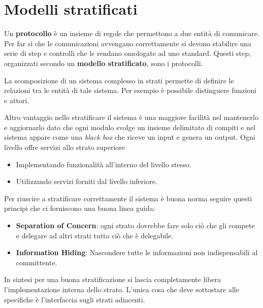 \section{Modelli stratificati}
Un \textbf{protocollo} è un insieme di regole che permettono a due 
entità di comunicare. Per far si che le comunicazioni avvengano 
correttamente si devono stabilire una serie di step e controlli che 
le rendano omologate ad uno standard. Questi step, organizzati secondo
un \textbf{modello stratificato}, sono i protocolli.

La scomposizione di un sistema complesso in strati permette di definire
le relazioni tra le entità di tale sistema. Per esempio è possibile 
distinguere funzioni e attori.

Altro vantaggio nello stratificare il sistema è una maggiore facilità 
nel mantenerlo e aggiornarlo dato che ogni modulo svolge un insieme 
delimitato di compiti e nel sistema appare come una \emph{black box} 
che riceve un input e genera un output. Ogni livello offre servizi 
allo strato superiore
\begin{itemize}
	\item Implementando funzionalità all'interno del livello stesso.
	\item Utilizzando servizi forniti dal livello inferiore.
\end{itemize}
Per riuscire a stratificare correttamente il sistema è buona norma 
seguire questi principi che ci forniscono una buona linea guida:
\begin{itemize}
	\item \textbf{Separation of Concern}: ogni strato dovrebbe fare 
		solo ciò che gli compete e delegare ad altri strati tutto ciò
		che è delegabile.
	\item \textbf{Information Hiding}: Nascondere tutte le informazioni
		non indispensabili al committente.
\end{itemize}
In sintesi per una buona stratificazione si lascia completamente libera
l'implementazione interna dello strato. L'unica cosa che deve
sottostare alle specifiche è l'interfaccia sugli strati adiacenti.

